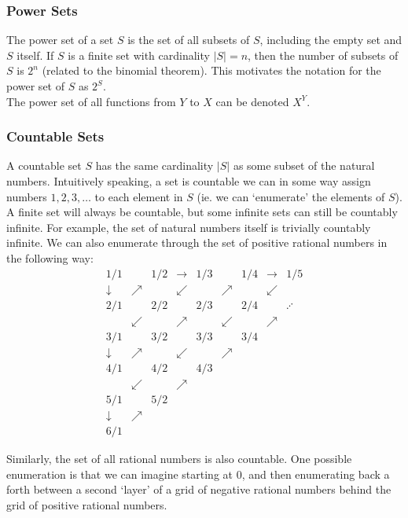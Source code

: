 \documentclass[11pt]{report} %
\begin{document}
\subsubsection{Power Sets}
The power set of a set $S$ is the set of all subsets of $S$, including the empty set and $S$ itself. If $S$ is a finite set with cardinality $\left|S\right| = n$, then the number of subsets of $S$ is $2^{n}$ (related to the binomial theorem). This motivates the notation for the power set of $S$ as $2^{S}$. \\

The power set of all functions from $Y$ to $X$ can be denoted $X^{Y}$.

\subsubsection{Countable Sets}
A countable set $S$ has the same cardinality $\left|S\right|$ as some subset of the natural numbers. Intuitively speaking, a set is countable we can in some way assign numbers $1, 2, 3, \dots$ to each element in $S$ (ie. we can `enumerate' the elements of $S$). A finite set will always be countable, but some infinite sets can still be countably infinite. For example, the set of natural numbers itself is trivially countably infinite. We can also enumerate through the set of positive rational numbers in the following way:
\begin{equation*}
\begin{array}{ccccccccc}
1/1 &  & 1/2 & \rightarrow & 1/3 &  & 1/4 & \rightarrow & 1/5\\
\downarrow & \nearrow &  & \swarrow &  & \nearrow &  & \swarrow\\
2/1 &  & 2/2 &  & 2/3 &  & 2/4 &  & \iddots\\
 & \swarrow &  & \nearrow &  & \swarrow &  & \nearrow\\
3/1 &  & 3/2 &  & 3/3 &  & 3/4\\
\downarrow & \nearrow &  & \swarrow &  & \nearrow\\
4/1 &  & 4/2 &  & 4/3\\
 & \swarrow &  & \nearrow\\
5/1 &  & 5/2\\
\downarrow & \nearrow\\
6/1
\end{array}
\end{equation*}

Similarly, the set of all rational numbers is also countable. One possible enumeration is that we can imagine starting at 0, and then enumerating back a forth between a second `layer' of a grid of negative rational numbers behind the grid of positive rational numbers. \\
\end{document}

